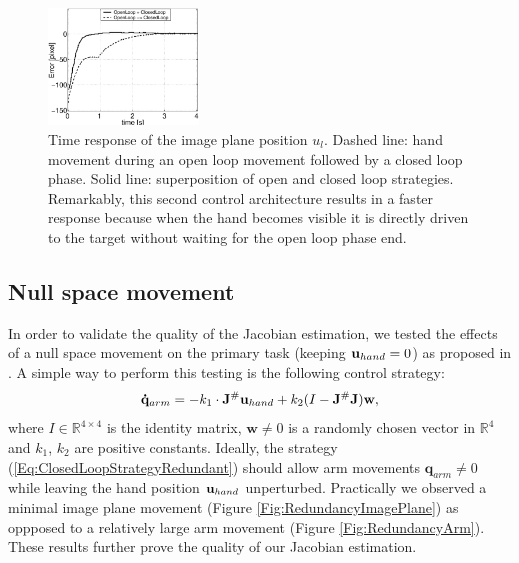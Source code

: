   \begin{figure}
  \begin{center}
	  \parbox{40mm}{\includegraphics[width=40mm]{Figure/OpenVSClosedLoopTimeResponse1.eps}}
  \end{center}
\caption{Time response of the image plane position $u_l$. Dashed line: hand movement
during an open loop movement followed by a closed loop phase. Solid line: superposition of open and closed loop strategies.
 Remarkably, this second control architecture results in a faster response because when the hand becomes visible it is 
directly driven to the target without waiting for the open loop phase end.}\label{Fig:TimeResponseOpenVSClosedLoop}
  \end{figure}

\subsection{Null space movement}

In order to validate the quality of the Jacobian estimation, we tested the effects of a null space movement 
on the primary task (keeping $\mathbf{u}_{hand} = 0$) as proposed in \cite{Mansard06jacobian}. A simple way to perform this testing is the following control strategy:
\begin{equation} \label{Eq:ClosedLoopStrategyRedundant}
\mathbf{\dot q}_{arm}=-k_1 \cdot \mathbf J^\# \mathbf{u}_{hand} + k_2 (I - \mathbf J^\# \mathbf J) \mathbf w, 
\end{equation}
where $I \in \mathbb R^{4 \times 4}$ is the identity matrix, $\mathbf w \neq 0$ is a 
randomly chosen vector in $\mathbb R^4$ and $k_1$, $k_2$ are positive constants. 
Ideally, the strategy (\ref{Eq:ClosedLoopStrategyRedundant}) should allow arm movements 
$\mathbf{q}_{arm} \neq 0$ while leaving the hand position $\mathbf{u}_{hand}$ unperturbed. Practically we observed 
a minimal image plane movement (Figure \ref{Fig:RedundancyImagePlane})
as oppposed to a relatively large arm movement (Figure \ref{Fig:RedundancyArm}). These results 
further prove the quality of our Jacobian estimation.

